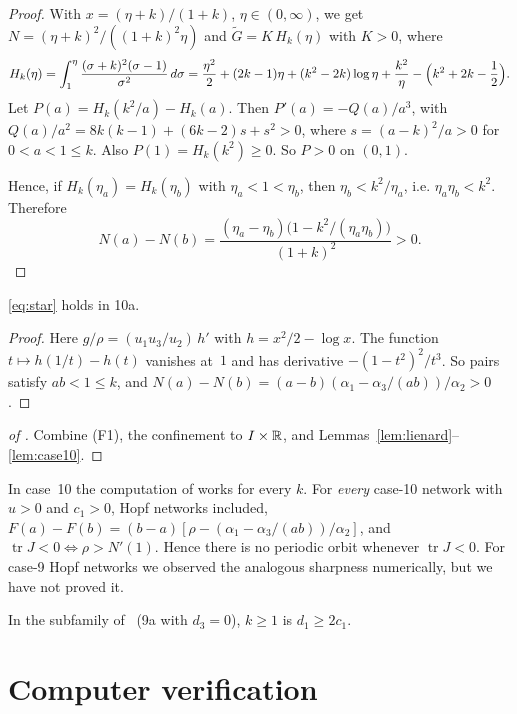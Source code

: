 \documentclass[11pt,a4paper]{report}
\newcommand{\Trop}{\operatorname{tr}}
\newcommand{\Gt}{\widetilde G}
\begin{document}
\begin{proof}
With \(x=(\eta+k)/(1+k)\), \(\eta\in(0,\infty)\), we get \(N=(\eta+k)^2/((1+k)^2\eta)\) and \(\Gt=K\,H_k(\eta)\)
with \(K>0\), where
\[
H_k(\eta)=\int_1^\eta\frac{(\sigma+k)^2(\sigma-1)}{\sigma^2}\,d\sigma
=\frac{\eta^2}{2}+(2k-1)\eta+(k^2-2k)\log\eta+\frac{k^2}{\eta}-\Bigl(k^2+2k-\frac12\Bigr).
\]
Let \(P(a)=H_k(k^2/a)-H_k(a)\). Then \(P'(a)=-Q(a)/a^3\), with
\(Q(a)/a^2=8k(k-1)+(6k-2)s+s^2>0\), where \(s=(a-k)^2/a>0\) for \(0<a<1\le k\). Also \(P(1)=H_k(k^2)\ge0\). So
\(P>0\) on \((0,1)\).

Hence, if \(H_k(\eta_a)=H_k(\eta_b)\) with \(\eta_a<1<\eta_b\), then \(\eta_b<k^2/\eta_a\), i.e.
\(\eta_a\eta_b<k^2\). Therefore
\[
N(a)-N(b)=\frac{(\eta_a-\eta_b)\bigl(1-k^2/(\eta_a\eta_b)\bigr)}{(1+k)^2}>0.
\]
\end{proof}

\begin{lemma}\label{lem:case10}
\eqref{eq:star} holds in 10a.
\end{lemma}

\begin{proof}
Here \(g/\rho=(u_1u_3/u_2)\,h'\) with \(h=x^2/2-\log x\). The function \(t\mapsto h(1/t)-h(t)\) vanishes at~\(1\)
and has derivative \(-(1-t^2)^2/t^3\). So pairs satisfy \(ab<1\le k\), and
\(N(a)-N(b)=(a-b)(\alpha_1-\alpha_3/(ab))/\alpha_2>0\).
\end{proof}

\begin{proof}[of ]
Combine (F1), the confinement to \(I\times\mathbb{R}\), and Lemmas~\ref{lem:lienard}--\ref{lem:case10}.
\end{proof}

\begin{remark}
In case~10 the computation of  works for every \(k\). For \emph{every} case-10 network with
\(u>0\) and \(c_1>0\), Hopf networks included,
\(F(a)-F(b)=(b-a)[\rho-(\alpha_1-\alpha_3/(ab))/\alpha_2]\), and \(\Trop J<0\iff\rho>N'(1)\). Hence there is no
periodic orbit whenever \(\Trop J<0\). For case-9 Hopf networks we observed the analogous sharpness numerically, but
we have not proved it.

In the subfamily of~\autocite{Result2} (9a with \(d_3=0\)), \(k\ge1\) is \(d_1\ge2c_1\).
\end{remark}

\section{Computer verification}
\end{document}
